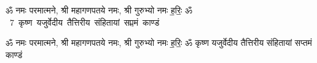 \documentclass[17pt]{extarticle}
\begin{document}
\begin{titlepage}
    \begin{center}
 
\begin{sanskrit}
    { \Large
    ॐ नमः परमात्मने, श्री महागणपतये नमः, श्री गुरुभ्यो नमः
ह॒रिः॒ ॐ 
    }
    \\
    \vspace{2.5cm}
    \mbox{ \Huge
    7       कृष्ण यजुर्वेदीय तैत्तिरीय संहितायां सप्तमं काण्डं    }
\end{sanskrit}
\end{center}

\end{titlepage}
\tableofcontents

ॐ नमः परमात्मने, श्री महागणपतये नमः, श्री गुरुभ्यो नमः
ह॒रिः॒ ॐ        कृष्ण यजुर्वेदीय तैत्तिरीय संहितायां सप्तमं काण्डं  \newline
\end{document}
